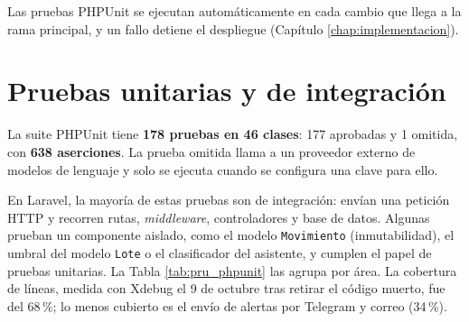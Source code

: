 Las pruebas PHPUnit se ejecutan automáticamente en cada cambio que llega a la rama principal, y un fallo detiene el despliegue (Capítulo \ref{chap:implementacion}).

\section{Pruebas unitarias y de integración}
\label{sec:pru_phpunit}

La suite PHPUnit tiene \textbf{178 pruebas en 46 clases}: 177 aprobadas y 1 omitida, con \textbf{638 aserciones}. La prueba omitida llama a un proveedor externo de modelos de lenguaje y solo se ejecuta cuando se configura una clave para ello.

En Laravel, la mayoría de estas pruebas son de integración: envían una petición HTTP y recorren rutas, \textit{middleware}, controladores y base de datos. Algunas prueban un componente aislado, como el modelo \texttt{Movimiento} (inmutabilidad), el umbral del modelo \texttt{Lote} o el clasificador del asistente, y cumplen el papel de pruebas unitarias. La Tabla \ref{tab:pru_phpunit} las agrupa por área. La cobertura de líneas, medida con Xdebug el 9 de octubre tras retirar el código muerto, fue del 68\,\%; lo menos cubierto es el envío de alertas por Telegram y correo (34\,\%).

